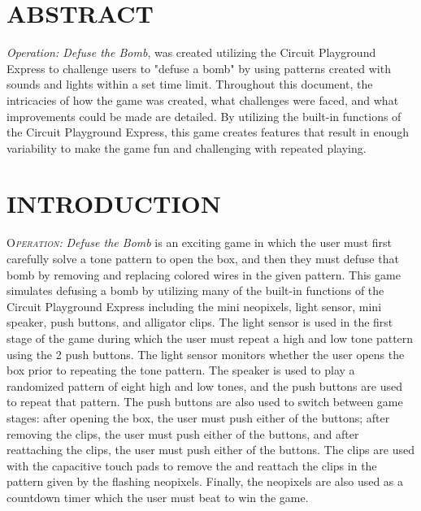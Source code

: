 \documentclass[12pt]{article}
\begin{document}
\tableofcontents
\pagebreak

\section{ABSTRACT}

\textit{Operation: Defuse the Bomb}, was created utilizing the Circuit Playground Express to challenge users to "defuse a bomb" by using patterns created with sounds and lights within a set time limit. Throughout this document, the intricacies of how the game was created, what challenges were faced, and what improvements could be made are detailed. By utilizing the built-in functions of the Circuit Playground Express, this game creates features that result in enough variability to make the game fun and challenging with repeated playing.

\newpage
\section{INTRODUCTION}

\lettrine[lines = 5]{O}{\textit{peration:}} \textit{Defuse the Bomb} is an exciting game in which the user must first carefully solve a tone pattern to open the box, and then they must defuse that bomb by removing and replacing colored wires in the given pattern.  This game simulates defusing a bomb by utilizing many of the built-in functions of the Circuit Playground Express including the mini neopixels, light sensor, mini speaker, push buttons, and alligator clips. The light sensor is used in the first stage of the game during which the user must repeat a high and low tone pattern using the 2 push buttons.  The light sensor monitors whether the user opens the box prior to repeating the tone pattern. The speaker is used to play a randomized pattern of eight high and low tones, and the push buttons are used to repeat that pattern.  The push buttons are also used to switch between game stages: after opening the box, the user must push either of the buttons; after removing the clips, the user must push either of the buttons, and after reattaching the clips, the user must push either of the buttons.  The clips are used with the capacitive touch pads to remove the and reattach the clips in the pattern given by the flashing neopixels.  Finally, the neopixels are also used as a countdown timer which the user must beat to win the game.
\end{document}
